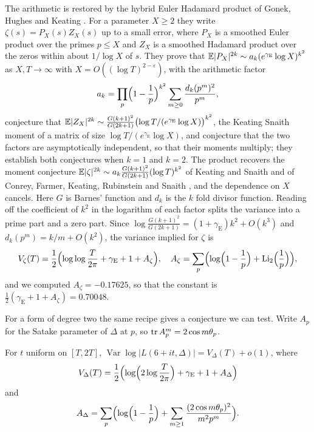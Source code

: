 The arithmetic is restored by the hybrid Euler Hadamard product of Gonek, Hughes and Keating \cite{ghk2007}. For a parameter $X\ge2$ they write $\zeta(s)=P_X(s)Z_X(s)$ up to a small error, where $P_X$ is a smoothed Euler product over the primes $p\le X$ and $Z_X$ is a smoothed Hadamard product over the zeros within about $1/\log X$ of $s$. They prove that $\mathbb{E}|P_X|^{2k}\sim a_k(e^{\gamma_{\mathrm E}}\log X)^{k^2}$ as $X,T\to\infty$ with $X=O((\log T)^{2-\varepsilon})$, with the arithmetic factor
\[
a_k=\prod_p\Bigl(1-\frac1p\Bigr)^{k^2}\sum_{m\ge0}\frac{d_k(p^m)^2}{p^m},
\]
conjecture that $\mathbb{E}|Z_X|^{2k}\sim\frac{G(k+1)^2}{G(2k+1)}\bigl(\log T/(e^{\gamma_{\mathrm E}}\log X)\bigr)^{k^2}$, the Keating Snaith moment of a matrix of size $\log T/(e^{\gamma_{\mathrm E}}\log X)$, and conjecture that the two factors are asymptotically independent, so that their moments multiply; they establish both conjectures when $k=1$ and $k=2$. The product recovers the moment conjecture $\mathbb{E}|\zeta|^{2k}\sim a_k\frac{G(k+1)^2}{G(2k+1)}(\log T)^{k^2}$ of Keating and Snaith and of Conrey, Farmer, Keating, Rubinstein and Snaith \cite{cfkrs2005}, and the dependence on $X$ cancels. Here $G$ is Barnes' function and $d_k$ is the $k$ fold divisor function. Reading off the coefficient of $k^2$ in the logarithm of each factor splits the variance into a prime part and a zero part. Since $\log\frac{G(k+1)^2}{G(2k+1)}=(1+\gamma_{\mathrm E})k^2+O(k^3)$ and $d_k(p^m)=k/m+O(k^2)$, the variance implied for $\zeta$ is
\begin{equation}\label{eq:09bvarzeta}
V_\zeta(T)=\frac12\Bigl(\log\log\frac{T}{2\pi}+\gamma_{\mathrm E}+1+A_\zeta\Bigr),\quad A_\zeta=\sum_p\Bigl(\log\Bigl(1-\frac1p\Bigr)+\mathrm{Li}_2\Bigl(\frac1p\Bigr)\Bigr),
\end{equation}
and we computed $A_\zeta=-0.17625$, so that the constant is $\frac12(\gamma_{\mathrm E}+1+A_\zeta)=0.70048$.

For a form of degree two the same recipe gives a conjecture we can test. Write $A_p$ for the Satake parameter of $\Delta$ at $p$, so $\operatorname{tr} A_p^m=2\cos m\theta_p$.

\begin{conjecture}\label{conj:09bvar}
For $t$ uniform on $[T,2T]$,
$\operatorname{Var}\log|L(6+it,\Delta)|=V_\Delta(T)+o(1)$, where
\[
V_\Delta(T)=\frac12\Bigl(\log\Bigl(2\log\frac{T}{2\pi}\Bigr)+\gamma_{\mathrm E}+1+A_\Delta\Bigr)
\]
and
\[
A_\Delta=\sum_p\Bigl(\log\Bigl(1-\frac1p\Bigr)+\sum_{m\ge1}\frac{(2\cos m\theta_p)^2}{m^2p^m}\Bigr).
\]
\end{conjecture}

